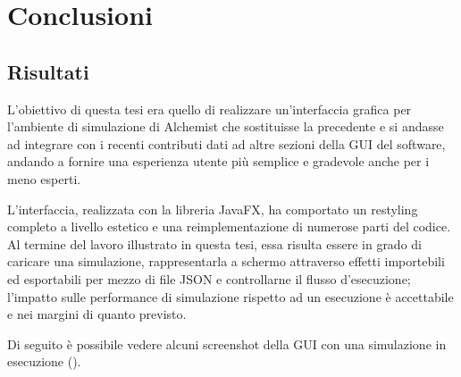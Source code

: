 

\chapter{Conclusioni}\label{ch:conclusioni}
    \section{Risultati}\label{sec:risultati}
        L'obiettivo di questa tesi era quello di realizzare un'interfaccia grafica per l'ambiente di simulazione di Alchemist che sostituisse la precedente e si andasse ad integrare con i recenti contributi dati ad altre sezioni della GUI del software, andando a fornire una esperienza utente più semplice e gradevole anche per i meno esperti.

        L'interfaccia, realizzata con la libreria JavaFX, ha comportato un restyling completo a livello estetico e una reimplementazione di numerose parti del codice.
        Al termine del lavoro illustrato in questa tesi, essa risulta essere in grado di caricare una simulazione, rappresentarla a schermo attraverso effetti importebili ed esportabili per mezzo di file JSON e controllarne il flusso d'esecuzione; l'impatto sulle performance di simulazione rispetto ad un esecuzione  è accettabile e nei margini di quanto previsto.

        Di seguito è possibile vedere alcuni screenshot della GUI con una simulazione in esecuzione ().


